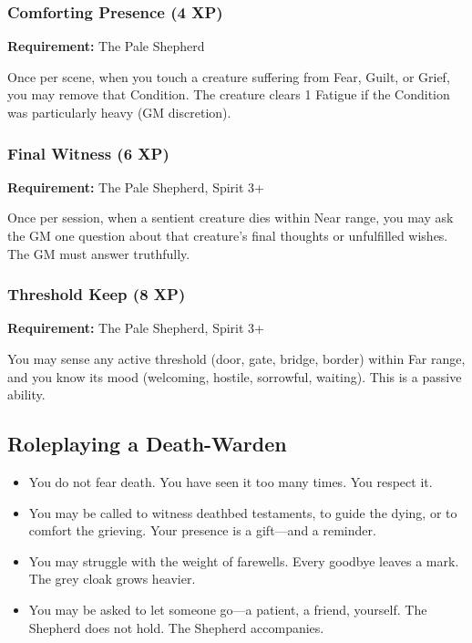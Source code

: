 \subsubsection{Comforting Presence (4 XP)}

\textbf{Requirement:} The Pale Shepherd

Once per scene, when you touch a creature suffering from Fear, Guilt, or Grief, you may remove that Condition. The creature clears 1 Fatigue if the Condition was particularly heavy (GM discretion).

\subsubsection{Final Witness (6 XP)}

\textbf{Requirement:} The Pale Shepherd, Spirit 3+

Once per session, when a sentient creature dies within Near range, you may ask the GM one question about that creature's final thoughts or unfulfilled wishes. The GM must answer truthfully.

\subsubsection{Threshold Keep (8 XP)}

\textbf{Requirement:} The Pale Shepherd, Spirit 3+

You may sense any active threshold (door, gate, bridge, border) within Far range, and you know its mood (welcoming, hostile, sorrowful, waiting). This is a passive ability.

\subsection{Roleplaying a Death-Warden}

\begin{itemize}
\item You do not fear death. You have seen it too many times. You respect it.
\item You may be called to witness deathbed testaments, to guide the dying, or to comfort the grieving. Your presence is a gift—and a reminder.
\item You may struggle with the weight of farewells. Every goodbye leaves a mark. The grey cloak grows heavier.
\item You may be asked to let someone go—a patient, a friend, yourself. The Shepherd does not hold. The Shepherd accompanies.
\end{itemize}

